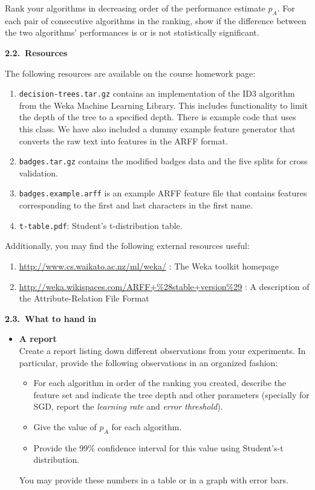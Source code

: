 \begin{enumerate}
Rank your algorithms in decreasing order of the performance estimate
$p_A$.  For each pair of consecutive algorithms in the ranking, show
if the difference between the two algorithms' performances is or is
not statistically significant.

\textbf{2.2.~Resources}

The following resources are available on the course homework page:
\begin{enumerate}
\item {\tt decision-trees.tar.gz} contains an implementation of the
  ID3 algorithm from the Weka Machine Learning Library. This includes
  functionality to limit the depth of the tree to a specified
  depth. There is example code that uses this class. We have also included a
  dummy example feature generator that converts the raw text into features in
  the ARFF format.
\item {\tt badges.tar.gz} contains the modified badges data and the
  five splits for cross validation.
\item {\tt badges.example.arff} is an example ARFF feature file that contains
features corresponding to the first and last characters in the first name.
\item {\tt t-table.pdf}: Student's t-distribution table.
\end{enumerate}

Additionally, you may find the following external resources useful:
\begin{enumerate}
\item \url{http://www.cs.waikato.ac.nz/ml/weka/} : The Weka toolkit homepage
\item \url{http://weka.wikispaces.com/ARFF+%28stable+version%29} : A
description of the Attribute-Relation File Format
\end{enumerate}

\textbf{2.3.~What to hand in}

\begin{itemize}
\item {\bf A  report} \\
  Create a report listing down different observations from your experiments. 
In particular, provide the following observations in an organized fashion:
\begin{itemize}
\item For each algorithm in
  order of the ranking you created, describe the feature set and
  indicate the tree depth and other parameters (specially for SGD,
report the \textit{learning rate} and \textit{error threshold}).
\item  Give the value of  $p_A$ for each algorithm. 
\item Provide the 99\% confidence interval for this value using Student's-t distribution.
\end{itemize}
You may provide these numbers in a table
  or in a graph with error bars. 


\end{itemize}
\end{enumerate}
